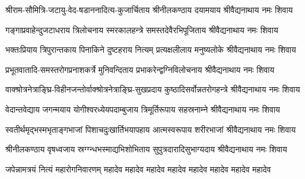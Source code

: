 
\twolineshloka
{श्रीराम-सौमित्रि-जटायु-वेद-षडाननादित्य-कुजार्चिताय}
{श्रीनीलकण्ठाय दयामयाय श्रीवैद्यनाथाय नमः शिवाय}

%
\twolineshloka
{गङ्गाप्रवाहेन्दुजटाधराय त्रिलोचनाय स्मरकालहन्त्रे}
{समस्तदेवैरभिपूजिताय श्रीवैद्यनाथाय नमः शिवाय}

\twolineshloka
{भक्तःप्रियाय त्रिपुरान्तकाय पिनाकिने दुष्टहराय नित्यम्}
{प्रत्यक्षलीलाय मनुष्यलोके श्रीवैद्यनाथाय नमः शिवाय}

\twolineshloka
{प्रभूतवातादि-समस्तरोगप्रनाशकर्त्रे मुनिवन्दिताय}
{प्रभाकरेन्द्वग्निविलोचनाय श्रीवैद्यनाथाय नमः शिवाय}

\twolineshloka
{वाक्श्रोत्रनेत्राङ्घ्रि-विहीनजन्तोर्वाक्श्रोत्रनेत्राङ्घ्रि-सुखप्रदाय}
{कुष्ठादिसर्वोन्नतरोगहन्त्रे श्रीवैद्यनाथाय नमः शिवाय}

\twolineshloka
{वेदान्तवेद्याय जगन्मयाय योगीश्वरध्येयपदाम्बुजाय}
{त्रिमूर्तिरूपाय सहस्रनाम्ने श्रीवैद्यनाथाय नमः शिवाय}

\twolineshloka
{स्वतीर्थमृद्भस्मभृताङ्गभाजां पिशाचदुःखार्तिभयापहाय}
{आत्मस्वरूपाय शरीरभाजां श्रीवैद्यनाथाय नमः शिवाय}

\twolineshloka
{श्रीनीलकण्ठाय वृषध्वजाय स्रग्ग्न्धभस्माद्यभिशोभिताय}
{सुपुत्रदारादिसुभाग्यदाय श्रीवैद्यनाथाय नमः शिवाय}

{जपेन्नामत्रयं नित्यं महारोगनिवारणम्}
{महादेव महादेव महादेव महादेव महादेव महादेव महादेव महादेव}
